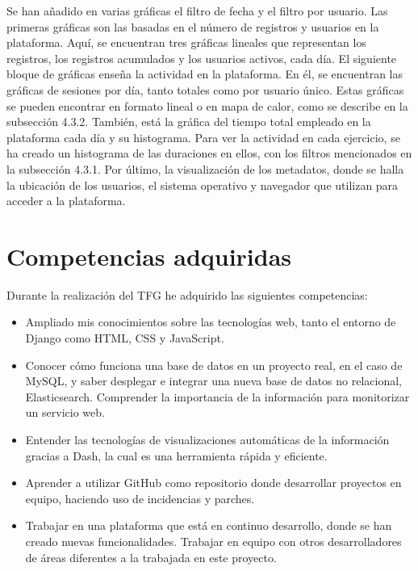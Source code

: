 Se han añadido en varias gráficas el filtro de fecha y el filtro por usuario. Las primeras gráficas son las basadas en el número de registros y usuarios en la plataforma. Aquí, se encuentran tres gráficas lineales que representan los registros, los registros acumulados y los usuarios activos, cada día. El siguiente bloque de gráficas enseña la actividad en la plataforma. En él, se encuentran las gráficas de sesiones por día, tanto totales como por usuario único. Estas gráficas se pueden encontrar en formato lineal o en mapa de calor, como se describe en la subsección 4.3.2. También, está la gráfica del tiempo total empleado en la plataforma cada día y su histograma. Para ver la actividad en cada ejercicio, se ha creado un histograma de las duraciones en ellos, con los filtros mencionados en la subsección 4.3.1.  Por último, la visualización de los metadatos, donde se halla la ubicación de los usuarios, el sistema operativo y navegador que utilizan para acceder a la plataforma.


	\section{Competencias adquiridas} 
	\label{sec:competencias_adquiridas} 
	Durante la realización del TFG he adquirido las siguientes competencias:
		
		\begin{itemize}
			\item Ampliado mis conocimientos sobre las tecnologías web, tanto el entorno de Django como HTML, CSS y JavaScript.
			\newpage
			\item Conocer cómo funciona una base de datos en un proyecto real, en el caso de MySQL, y saber desplegar e integrar una nueva base de datos no relacional, Elasticsearch. Comprender la importancia de la información para monitorizar un servicio web. 
			
			\item Entender las tecnologías de visualizaciones automáticas de la información gracias a Dash, la cual es una herramienta rápida y eficiente.
			
			\item Aprender a utilizar GitHub como repositorio donde desarrollar proyectos en equipo, haciendo uso de incidencias y parches. 
			
			\item Trabajar en una plataforma que está en continuo desarrollo, donde se han creado nuevas funcionalidades. Trabajar en equipo con otros desarrolladores de áreas diferentes a la trabajada en este proyecto.			
		\end{itemize}
